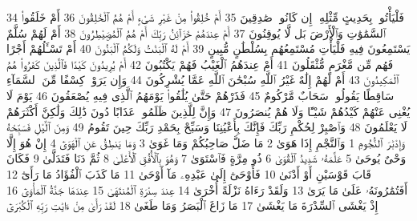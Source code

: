 {\tiny\colorbox{cl_aya}{34}} فَلْيَأْتُوا۟ بِحَدِيثٍ مِّثْلِهِۦٓ إِن كَانُوا۟ صَٰدِقِينَ
{\tiny\colorbox{cl_aya}{35}} أَمْ خُلِقُوا۟ مِنْ غَيْرِ شَىْءٍ أَمْ هُمُ ٱلْخَٰلِقُونَ
{\tiny\colorbox{cl_aya}{36}} أَمْ خَلَقُوا۟ ٱلسَّمَٰوَٰتِ وَٱلْأَرْضَ بَل لَّا يُوقِنُونَ
{\tiny\colorbox{cl_aya}{37}} أَمْ عِندَهُمْ خَزَآئِنُ رَبِّكَ أَمْ هُمُ ٱلْمُصَۣيْطِرُونَ
{\tiny\colorbox{cl_aya}{38}} أَمْ لَهُمْ سُلَّمٌ يَسْتَمِعُونَ فِيهِ فَلْيَأْتِ مُسْتَمِعُهُم بِسُلْطَٰنٍ مُّبِينٍ
{\tiny\colorbox{cl_aya}{39}} أَمْ لَهُ ٱلْبَنَٰتُ وَلَكُمُ ٱلْبَنُونَ
{\tiny\colorbox{cl_aya}{40}} أَمْ تَسْـَٔلُهُمْ أَجْرًا فَهُم مِّن مَّغْرَمٍ مُّثْقَلُونَ
{\tiny\colorbox{cl_aya}{41}} أَمْ عِندَهُمُ ٱلْغَيْبُ فَهُمْ يَكْتُبُونَ
{\tiny\colorbox{cl_aya}{42}} أَمْ يُرِيدُونَ كَيْدًا فَٱلَّذِينَ كَفَرُوا۟ هُمُ ٱلْمَكِيدُونَ
{\tiny\colorbox{cl_aya}{43}} أَمْ لَهُمْ إِلَٰهٌ غَيْرُ ٱللَّهِ سُبْحَٰنَ ٱللَّهِ عَمَّا يُشْرِكُونَ
{\tiny\colorbox{cl_aya}{44}} وَإِن يَرَوْا۟ كِسْفًا مِّنَ ٱلسَّمَآءِ سَاقِطًا يَقُولُوا۟ سَحَابٌ مَّرْكُومٌ
{\tiny\colorbox{cl_aya}{45}} فَذَرْهُمْ حَتَّىٰ يُلَٰقُوا۟ يَوْمَهُمُ ٱلَّذِى فِيهِ يُصْعَقُونَ
{\tiny\colorbox{cl_aya}{46}} يَوْمَ لَا يُغْنِى عَنْهُمْ كَيْدُهُمْ شَيْـًٔا وَلَا هُمْ يُنصَرُونَ
{\tiny\colorbox{cl_aya}{47}} وَإِنَّ لِلَّذِينَ ظَلَمُوا۟ عَذَابًا دُونَ ذَٰلِكَ وَلَٰكِنَّ أَكْثَرَهُمْ لَا يَعْلَمُونَ
{\tiny\colorbox{cl_aya}{48}} وَٱصْبِرْ لِحُكْمِ رَبِّكَ فَإِنَّكَ بِأَعْيُنِنَا وَسَبِّحْ بِحَمْدِ رَبِّكَ حِينَ تَقُومُ
{\tiny\colorbox{cl_aya}{49}} وَمِنَ ٱلَّيْلِ فَسَبِّحْهُ وَإِدْبَٰرَ ٱلنُّجُومِ
{\tiny\colorbox{cl_aya}{1}} وَٱلنَّجْمِ إِذَا هَوَىٰ
{\tiny\colorbox{cl_aya}{2}} مَا ضَلَّ صَاحِبُكُمْ وَمَا غَوَىٰ
{\tiny\colorbox{cl_aya}{3}} وَمَا يَنطِقُ عَنِ ٱلْهَوَىٰٓ
{\tiny\colorbox{cl_aya}{4}} إِنْ هُوَ إِلَّا وَحْىٌ يُوحَىٰ
{\tiny\colorbox{cl_aya}{5}} عَلَّمَهُۥ شَدِيدُ ٱلْقُوَىٰ
{\tiny\colorbox{cl_aya}{6}} ذُو مِرَّةٍ فَٱسْتَوَىٰ
{\tiny\colorbox{cl_aya}{7}} وَهُوَ بِٱلْأُفُقِ ٱلْأَعْلَىٰ
{\tiny\colorbox{cl_aya}{8}} ثُمَّ دَنَا فَتَدَلَّىٰ
{\tiny\colorbox{cl_aya}{9}} فَكَانَ قَابَ قَوْسَيْنِ أَوْ أَدْنَىٰ
{\tiny\colorbox{cl_aya}{10}} فَأَوْحَىٰٓ إِلَىٰ عَبْدِهِۦ مَآ أَوْحَىٰ
{\tiny\colorbox{cl_aya}{11}} مَا كَذَبَ ٱلْفُؤَادُ مَا رَأَىٰٓ
{\tiny\colorbox{cl_aya}{12}} أَفَتُمَٰرُونَهُۥ عَلَىٰ مَا يَرَىٰ
{\tiny\colorbox{cl_aya}{13}} وَلَقَدْ رَءَاهُ نَزْلَةً أُخْرَىٰ
{\tiny\colorbox{cl_aya}{14}} عِندَ سِدْرَةِ ٱلْمُنتَهَىٰ
{\tiny\colorbox{cl_aya}{15}} عِندَهَا جَنَّةُ ٱلْمَأْوَىٰٓ
{\tiny\colorbox{cl_aya}{16}} إِذْ يَغْشَى ٱلسِّدْرَةَ مَا يَغْشَىٰ
{\tiny\colorbox{cl_aya}{17}} مَا زَاغَ ٱلْبَصَرُ وَمَا طَغَىٰ
{\tiny\colorbox{cl_aya}{18}} لَقَدْ رَأَىٰ مِنْ ءَايَٰتِ رَبِّهِ ٱلْكُبْرَىٰٓ
